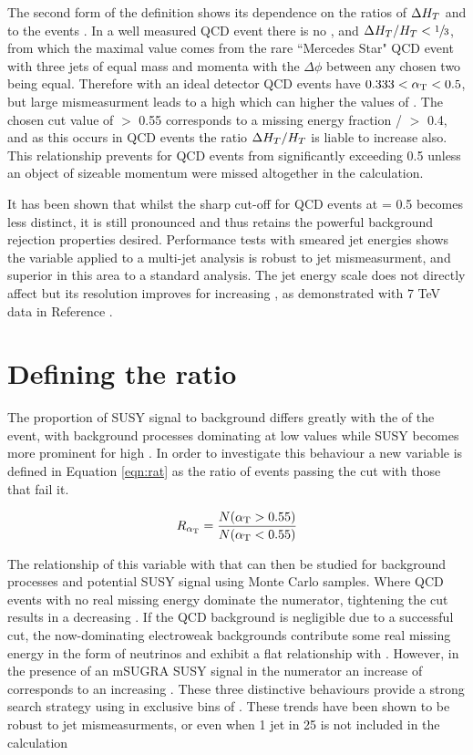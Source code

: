 The second form of the definition shows its dependence on the ratios of $\Delta H_{T}$ and \mht to the events \HT. In a well measured QCD event there is no \mht, and $\Delta H_{T} / H_{T} < \sfrac{1}{3}$, from which the maximal value comes from the rare ``Mercedes Star" QCD event with three jets of equal mass and momenta with the $\Delta \phi$ between any chosen two being equal. Therefore with an ideal detector QCD events have $0.333 < \alpha_{\text{T}} < 0.5$, but large mismeasurment leads to a high \mht which can higher the values of \alt. The chosen cut value of \alt $>$ 0.55 corresponds to a missing energy fraction \mht / \HT $>$ 0.4, and as this occurs in QCD events the ratio $\Delta H_{T} / H_{T}$ is liable to increase also. This relationship prevents \alt for QCD events from significantly exceeding 0.5 unless an object of sizeable momentum were missed altogether in the calculation. 

It has been shown that whilst the sharp cut-off for QCD events at \alt = 0.5 becomes less distinct, it is still pronounced and thus retains the powerful background rejection properties desired\cite{an2009_56}. Performance tests with smeared jet energies shows the \alt variable applied to a multi-jet analysis is robust to jet mismeasurment, and superior in this area to a standard \met analysis. The jet energy scale does not directly affect \alt but its resolution improves for increasing \HT, as demonstrated with 7 TeV data in Reference \cite{an2010_119}. 

\section{Defining the ratio \RaT}

The proportion of SUSY signal to background differs greatly with the \HT of the event, with background processes dominating at low values while SUSY becomes more prominent for high \HT. In order to investigate this behaviour a new variable \RaT is defined in Equation \ref{eqn:rat} as the ratio of events passing the \alt cut with those that fail it. 

\begin{equation}
R_{\alpha_{\text{T}}} = \frac{N(\alpha_{\text{T}} > 0.55)}{N(\alpha_{\text{T}} < 0.55)}
\label{eqn:rat}
\end{equation}

The relationship of this variable with \HT that can then be studied for background processes and potential SUSY signal using Monte Carlo samples. Where QCD events with no real missing energy dominate the numerator, tightening the \HT cut results in a decreasing \RaT. If the QCD background is negligible due to a successful \alt cut, the now-dominating  electroweak backgrounds contribute some real missing energy in the form of neutrinos and exhibit a flat relationship with \HT. However, in the presence of an mSUGRA SUSY signal in the numerator an increase of \HT corresponds to an increasing \RaT. These three distinctive behaviours provide a strong search strategy using \RaT in exclusive bins of \HT. These trends have been shown to be robust to jet mismeasurments, or even when 1 jet in 25 is not included in the calculation \cite{}



